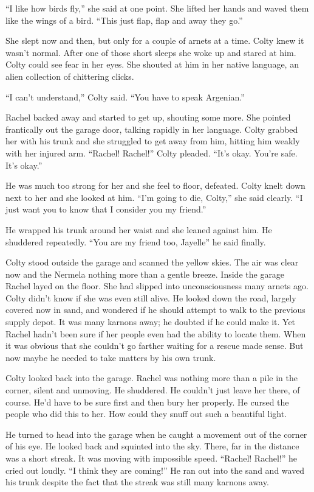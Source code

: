 ``I like how birds fly,'' she said at one point. She lifted her hands and waved them like the
wings of a bird. ``This just flap, flap and away they go.''

She slept now and then, but only for a couple of arnets at a time. Colty knew it wasn't normal.
After one of those short sleeps she woke up and stared at him. Colty could see fear in her eyes.
She shouted at him in her native language, an alien collection of chittering clicks.

``I can't understand,'' Colty said. ``You have to speak Argenian.''

Rachel backed away and started to get up, shouting some more. She pointed frantically out the
garage door, talking rapidly in her language. Colty grabbed her with his trunk and she struggled
to get away from him, hitting him weakly with her injured arm. ``Rachel! Rachel!'' Colty
pleaded. ``It's okay. You're safe. It's okay.''

He was much too strong for her and she feel to floor, defeated. Colty knelt down next to her and
she looked at him. ``I'm going to die, Colty,'' she said clearly. ``I just want you to know that
I consider you my friend.''

He wrapped his trunk around her waist and she leaned against him. He shuddered repeatedly. ``You
are my friend too, Jayelle'' he said finally.

\breakpoint

Colty stood outside the garage and scanned the yellow skies. The air was clear now and the
Nermela nothing more than a gentle breeze. Inside the garage Rachel layed on the floor. She had
slipped into unconsciousness many arnets ago. Colty didn't know if she was even still alive. He
looked down the road, largely covered now in sand, and wondered if he should attempt to walk to
the previous supply depot. It was many karnons away; he doubted if he could make it. Yet Rachel
hadn't been sure if her people even had the ability to locate them. When it was obvious that she
couldn't go farther waiting for a rescue made sense. But now maybe he needed to take matters
by his own trunk.

Colty looked back into the garage. Rachel was nothing more than a pile in the corner, silent and
unmoving. He shuddered. He couldn't just leave her there, of course. He'd have to be sure first
and then bury her properly. He cursed the people who did this to her. How could they snuff out
such a beautiful light.

He turned to head into the garage when he caught a movement out of the corner of his eye.
He looked back and squinted into the sky. There, far in the distance was a short streak. It was
moving with impossible speed. ``Rachel! Rachel!'' he cried out loudly. ``I think they are
coming!'' He ran out into the sand and waved his trunk despite the fact that the streak was
still many karnons away.

